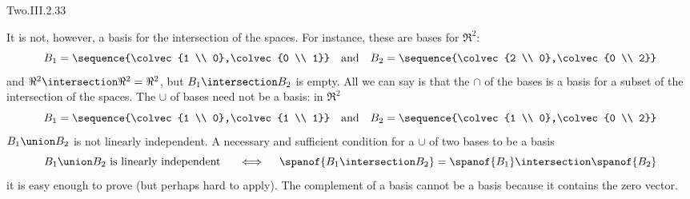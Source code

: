 \begin{ans}{Two.III.2.33}
\begin{exparts}
           It is not, however, a basis for the intersection of the spaces.
           For instance, these are bases for \( \Re^2 \):
           \begin{equation*}
             B_1=\sequence{\colvec{1 \\ 0},\colvec{0 \\ 1}}
             \quad\text{and}\quad
             B_2=\sequence{\colvec{2 \\ 0},\colvec{0 \\ 2}}
           \end{equation*}
           and \( \Re^2\intersection\Re^2=\Re^2 \), but
           \( B_1\intersection B_2 \) is empty.
           All we can say is that the $\cap$ of the bases is a basis
           for a subset of the intersection of the spaces.
         \partsitem The $\cup$ of bases need not be a basis: in \( \Re^2 \)
           \begin{equation*}
             B_1=\sequence{\colvec{1 \\ 0},\colvec{1 \\ 1}}
             \quad\text{and}\quad
             B_2=\sequence{\colvec{1 \\ 0},\colvec{0 \\ 2}}
           \end{equation*}
           \( B_1\union B_2 \) is not linearly independent.
           A necessary and sufficient condition for a $\cup$ of two bases
           to be a basis
           \begin{equation*}
             B_1\union B_2 \text{ is linearly independent }
             \quad\iff\quad
             \spanof{B_1\intersection B_2}=\spanof{B_1}\intersection
                                            \spanof{B_2}
           \end{equation*}
           it is easy enough to prove (but perhaps hard to apply).
         \partsitem The complement of a basis cannot be a basis
           because it contains the zero vector.
       \end{exparts}
     
\end{ans}
